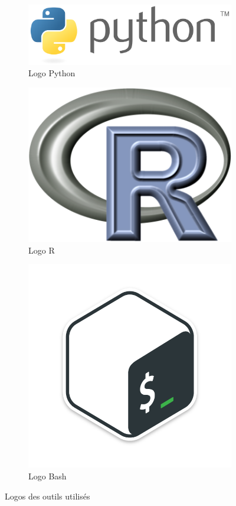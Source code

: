 		\begin{figure}[H]
			\begin{subfigure}[b]{.3\textwidth}
				\centering
				\includegraphics[width=\textwidth]{ch2-images/python}
				\caption{Logo Python}
				\label{fig:python}
			\end{subfigure}
			\begin{subfigure}[b]{.3\textwidth}
					\centering
					\includegraphics[width=.8\textwidth]{ch2-images/R}
					\caption{Logo R}
					\label{fig:R}
			\end{subfigure}
			\begin{subfigure}[b]{.3\textwidth}
					\centering
					\includegraphics[width=.8\textwidth]{ch2-images/Bash}
					\caption{Logo Bash}
					\label{fig:bash}
			\end{subfigure}
			\caption{Logos des outils utilisés}
		\end{figure}
